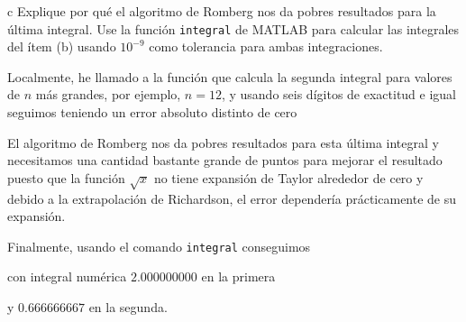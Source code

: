 \begin{statement}{c}
  Explique por qu\'e el algoritmo de Romberg
  nos da pobres resultados para la \'ultima integral.
  Use la funci\'on \texttt{integral} de MATLAB para calcular las integrales
  del \'item (b) usando $10^{-9}$ como tolerancia para ambas integraciones.
\end{statement}

\begin{solution}
  Localmente, he llamado a la funci\'on que calcula la segunda integral
  para valores de $n$ m\'as grandes, por ejemplo, $n = 12$, y usando seis
  d\'igitos de exactitud e igual seguimos teniendo un error absoluto distinto de cero
  
  El algoritmo de Romberg nos da pobres resultados para esta \'ultima integral
  y necesitamos una cantidad bastante grande de puntos para mejorar el resultado
  puesto que la funci\'on $\sqrt{x}$ no tiene expansi\'on de Taylor alrededor de cero
  y debido a la extrapolaci\'on de Richardson, el error depender\'ia pr\'acticamente
  de su expansi\'on.

  Finalmente, usando el comando \texttt{integral} conseguimos
  
  con integral num\'erica $2.000000000$ en la primera
  
  y $0.666666667$ en la segunda.
\end{solution}
